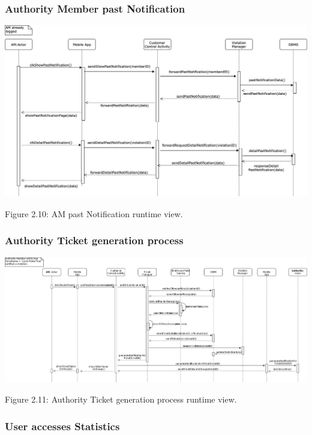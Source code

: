 \documentclass[12pt]{article}
\begin{document}
\subsubsection{Authority Member past Notification}
\begin{center}
\includegraphics[scale=0.30]{SequenceDiagram/AMPastNotification.jpg}


\vspace{2mm}
Figure 2.10: AM past Notification runtime view.
\end{center}
\subsubsection{Authority Ticket generation process}
\begin{center}
\includegraphics[scale=0.28]{SequenceDiagram/ticketGenerationProcess.jpg}


\vspace{2mm}
Figure 2.11: Authority Ticket generation process runtime view.
\end{center}
\subsubsection{User accesses Statistics}
\end{document}
